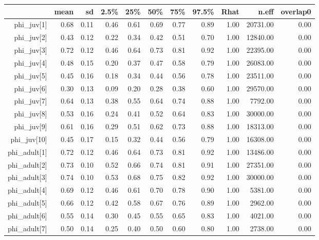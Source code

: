 \begin{table}[ht]
\centering
\begin{tabular}{rrrrrrrrrrr}
  \hline
 & mean & sd & 2.5\% & 25\% & 50\% & 75\% & 97.5\% & Rhat & n.eff & overlap0 \\ 
  \hline
phi\_juv[1] & 0.68 & 0.11 & 0.46 & 0.61 & 0.69 & 0.77 & 0.89 & 1.00 & 20731.00 & 0.00 \\ 
  phi\_juv[2] & 0.43 & 0.12 & 0.22 & 0.34 & 0.42 & 0.51 & 0.70 & 1.00 & 12840.00 & 0.00 \\ 
  phi\_juv[3] & 0.72 & 0.12 & 0.46 & 0.64 & 0.73 & 0.81 & 0.92 & 1.00 & 22395.00 & 0.00 \\ 
  phi\_juv[4] & 0.48 & 0.15 & 0.20 & 0.37 & 0.47 & 0.58 & 0.79 & 1.00 & 26083.00 & 0.00 \\ 
  phi\_juv[5] & 0.45 & 0.16 & 0.18 & 0.34 & 0.44 & 0.56 & 0.78 & 1.00 & 23511.00 & 0.00 \\ 
  phi\_juv[6] & 0.30 & 0.13 & 0.09 & 0.20 & 0.28 & 0.38 & 0.60 & 1.00 & 29570.00 & 0.00 \\ 
  phi\_juv[7] & 0.64 & 0.13 & 0.38 & 0.55 & 0.64 & 0.74 & 0.88 & 1.00 & 7792.00 & 0.00 \\ 
  phi\_juv[8] & 0.53 & 0.16 & 0.24 & 0.41 & 0.52 & 0.64 & 0.83 & 1.00 & 30000.00 & 0.00 \\ 
  phi\_juv[9] & 0.61 & 0.16 & 0.29 & 0.51 & 0.62 & 0.73 & 0.88 & 1.00 & 18313.00 & 0.00 \\ 
  phi\_juv[10] & 0.45 & 0.17 & 0.15 & 0.32 & 0.44 & 0.56 & 0.79 & 1.00 & 16308.00 & 0.00 \\ 
  phi\_adult[1] & 0.72 & 0.12 & 0.46 & 0.64 & 0.73 & 0.81 & 0.92 & 1.00 & 13486.00 & 0.00 \\ 
  phi\_adult[2] & 0.73 & 0.10 & 0.52 & 0.66 & 0.74 & 0.81 & 0.91 & 1.00 & 27351.00 & 0.00 \\ 
  phi\_adult[3] & 0.74 & 0.10 & 0.53 & 0.68 & 0.75 & 0.82 & 0.92 & 1.00 & 30000.00 & 0.00 \\ 
  phi\_adult[4] & 0.69 & 0.12 & 0.46 & 0.61 & 0.70 & 0.78 & 0.90 & 1.00 & 5381.00 & 0.00 \\ 
  phi\_adult[5] & 0.66 & 0.12 & 0.42 & 0.58 & 0.67 & 0.76 & 0.89 & 1.00 & 2962.00 & 0.00 \\ 
  phi\_adult[6] & 0.55 & 0.14 & 0.30 & 0.45 & 0.55 & 0.65 & 0.83 & 1.00 & 4021.00 & 0.00 \\ 
  phi\_adult[7] & 0.50 & 0.14 & 0.25 & 0.40 & 0.50 & 0.60 & 0.80 & 1.00 & 2738.00 & 0.00 \\ 

\end{tabular}
\end{table}
